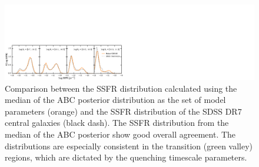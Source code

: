 \documentclass[iop,apj,tighten,twocolappendix,numberedappendix]{emulateapj}
\begin{document}
\begin{figure}
\begin{center}
\includegraphics[width=\textwidth] {figs/SSFR_ABC_posterior_RHOssfrfq_TinkerFq_Std_updated_prior.pdf}
\caption{Comparison between the SSFR distribution calculated using the 
median of the ABC posterior distribution as the set of model parameters (orange)
and the SSFR distribution of the SDSS DR7 central galaxies (black dash). The SSFR 
distribution from the median of the ABC posterior show good overall agreement. The 
distributions are especially consistent in the transition (green valley) regions, 
which are dictated by the quenching timescale parameters.}
\label{fig:abc_ssfr}
\end{center}
\end{figure}
\end{document}
